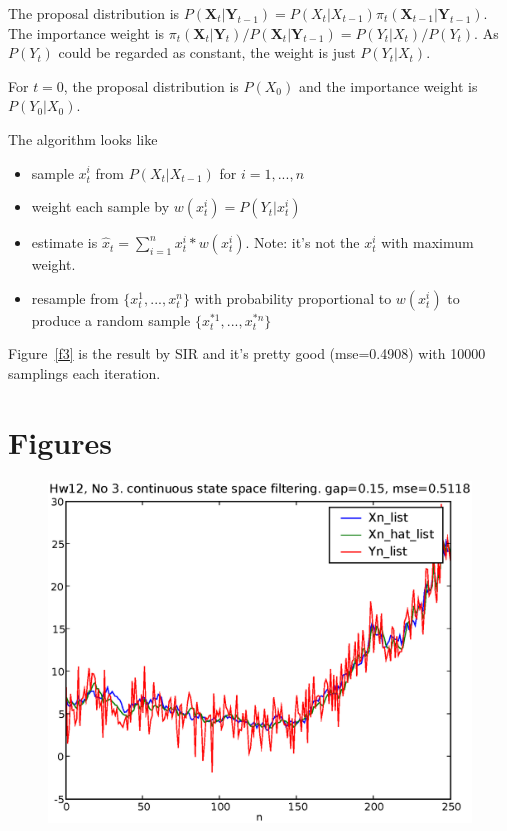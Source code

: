 \documentclass[a4paper,10pt]{article}
\begin{document}
The proposal distribution is $P(\mathbf{X}_t|\mathbf{Y}_{t-1}) = P(X_t|X_{t-1})\pi_t(\mathbf{X}_{t-1}|\mathbf{Y}_{t-1})$. The importance weight is $\pi_t(\mathbf{X}_t|\mathbf{Y}_t)/P(\mathbf{X}_t|\mathbf{Y}_{t-1}) = P(Y_t|X_t)/P(Y_t)$. As $P(Y_t)$ could be regarded as constant, the weight is just $P(Y_t|X_t)$.

For $t=0$, the proposal distribution is $P(X_0)$ and the importance weight is $P(Y_0|X_0)$.

The algorithm looks like
\begin{itemize}
\item sample $x_t^i$ from $P(X_t|X_{t-1})$ for $i=1,...,n$
\item weight each sample by $w(x_t^i) = P(Y_t|x_t^i)$
\item estimate is $\hat{x}_t = \sum_{i=1}^n x_t^i*w(x_t^i)$. Note: it's not the $x_t^i$ with maximum weight.
\item resample from $\{x_t^1, ..., x_t^n\}$ with probability proportional to $w(x_t^i)$ to produce a random sample $\{x_t^{*1}, ..., x_t^{*n}\}$
\end{itemize}

Figure~\ref{f3} is the result by SIR and it's pretty good (mse=0.4908) with 10000 samplings each iteration.

\section{Figures}

\begin{figure}
\includegraphics[width=1\textwidth]{hw12_3_gap_0_15.eps}
\caption{}\label{f1}
\end{figure}
\end{document}

